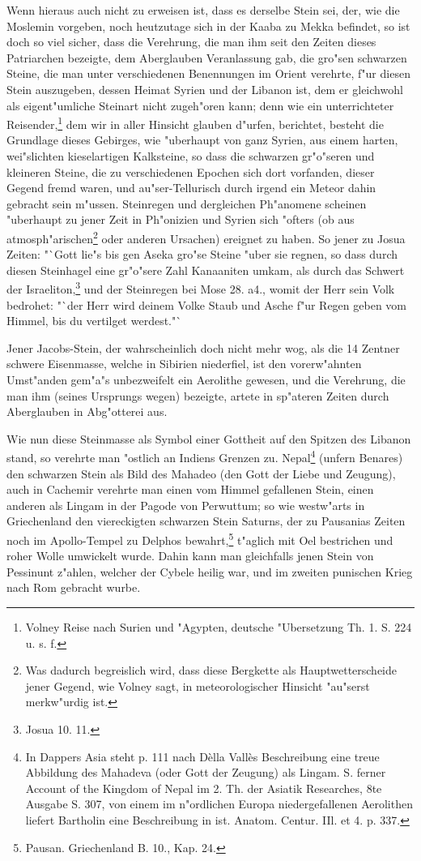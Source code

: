 \documentclass[a4paper, 11pt, oneside, polutonikogreek, german]{article}
\begin{document}
Wenn hieraus auch nicht zu erweisen ist, dass es derselbe Stein sei, der, wie die Moslemin vorgeben, noch heutzutage sich in der Kaaba zu Mekka befindet, so ist doch so viel sicher, dass die Verehrung, die man ihm seit den Zeiten dieses Patriarchen bezeigte, dem Aberglauben Veranlassung gab, die gro"sen schwarzen Steine, die man unter verschiedenen Benennungen im Orient verehrte, f"ur diesen Stein auszugeben, dessen Heimat Syrien und der Libanon ist, dem er gleichwohl als eigent"umliche Steinart nicht zugeh"oren kann; denn wie ein unterrichteter Reisender,\footnote{Volney Reise nach Surien und "Agypten, deutsche "Ubersetzung Th. 1. S. 224 u. s. f.} dem wir in aller Hinsicht glauben d"urfen, berichtet, besteht die Grundlage dieses Gebirges, wie "uberhaupt von ganz Syrien, aus einem harten, wei"slichten kieselartigen Kalksteine, so dass die schwarzen gr"o"seren und kleineren Steine, die zu verschiedenen Epochen sich dort vorfanden, dieser Gegend fremd waren, und au"ser-Tellurisch durch irgend ein Meteor dahin gebracht sein m"ussen. Steinregen und dergleichen Ph"anomene scheinen "uberhaupt zu jener Zeit in Ph"onizien und Syrien sich "ofters (ob aus atmosph"arischen\footnote{Was dadurch begreislich wird, dass diese Bergkette als Hauptwetterscheide jener Gegend, wie Volney sagt, in meteorologischer Hinsicht "au"serst merkw"urdig ist.} oder anderen Ursachen) ereignet zu haben. So jener zu Josua Zeiten: "`Gott lie"s bis gen Aseka gro"se Steine "uber sie regnen, so dass durch diesen Steinhagel eine gr"o"sere Zahl Kanaaniten umkam, als durch das Schwert der Israeliton,\footnote{Josua 10. 11.} und der Steinregen bei Mose 28. a4., womit der Herr sein Volk bedrohet: "`der Herr wird deinem Volke Staub und Asche f"ur Regen geben vom Himmel, bis du vertilget werdest."`

Jener Jacobs-Stein, der wahrscheinlich doch nicht mehr wog, als die 14 Zentner schwere Eisenmasse, welche in Sibirien niederfiel, ist den vorerw"ahnten Umst"anden gem"a"s unbezweifelt ein Aerolithe gewesen, und die Verehrung, die man ihm (seines Ursprungs wegen) bezeigte, artete in sp"ateren Zeiten durch Aberglauben in Abg"otterei aus.

Wie nun diese Steinmasse als Symbol einer Gottheit auf den Spitzen des Libanon stand, so verehrte man "ostlich an Indiens Grenzen zu. Nepal\footnote{In Dappers Asia steht p. 111 nach Dèlla Vallès Beschreibung eine treue Abbildung des Mahadeva (oder Gott der Zeugung) als Lingam. S. ferner Account of the Kingdom of Nepal im 2. Th. der Asiatik Researches, 8te Ausgabe S. 307, von einem im n"ordlichen Europa niedergefallenen Aerolithen liefert Bartholin eine Beschreibung in ist. Anatom. Centur. IIl. et 4. p. 337.} (unfern Benares) den schwarzen Stein als Bild des Mahadeo (den Gott der Liebe und Zeugung), auch in Cachemir verehrte man einen vom Himmel gefallenen Stein, einen anderen als Lingam in der Pagode von Perwuttum; so wie westw"arts in Griechenland den viereckigten schwarzen Stein Saturns, der zu Pausanias Zeiten noch im Apollo-Tempel zu Delphos bewahrt,\footnote{Pausan. Griechenland B. 10., Kap. 24.} t"aglich mit Oel bestrichen und roher Wolle umwickelt wurde. Dahin kann man gleichfalls jenen Stein von Pessinunt z"ahlen, welcher der Cybele heilig war, und im zweiten punischen Krieg nach Rom gebracht wurbe.
\end{document}
